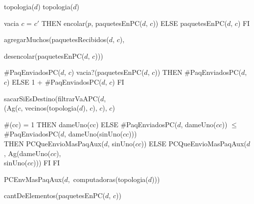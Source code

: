 \begin{tad}{}
	 {topologia($d$)}
	 {topologia($d$)}

	 {vacia}
	 { \IF $c$ = $c'$
																	THEN encolar($p$, paquetesEnPC($d$, $c$))
																	ELSE paquetesEnPC($d$, $c$)
																	FI}	
			  {agregarMuchos(paquetesRecibidos($d$, $c$), 			  
			  
			  \hspace{6.5em}  desencolar(paquetesEnPC($d$, $c$)))}
	
	 {\#PaqEnviadosPC($d$, $c$)}
	 { \IF vacia?(paquetesEnPC($d$, $c$))
															 THEN \#PaqEnviadosPC($d$, $c$)
															 ELSE 1 + \#PaqEnviadosPC($d$, $c$)
															 FI}	
	
	 {sacarSiEsDestino(filtrarVaAPC($d$, \\
												(Ag($c$, vecinos(topologia($d$), $c$), $c$), $c$)}
	
	
	
	
	 { \IF \#(cc) = 1
												THEN dameUno(cc)
												ELSE {\IF \#PaqEnviadosPC($d$, dameUno($cc$)) $\leq$ \\
										        		 \hspace*{1.1em}\#PaqEnviadosPC($d$, dameUno(sinUno($cc$)))\\
											 		 THEN PCQueEnvioMasPaqAux($d$, sinUno($cc$))
											 		 ELSE PCQueEnvioMasPaqAux($d$, Ag(dameUno($cc$), \\
											 		 \hspace*{14em}				      sinUno($cc$)))
													 FI}
												FI}	
	
	 {\mbox{PCEnvMasPaqAux($d$, computadoras(topologia($d$)))}}
	
	 {cantDeElementos(paquetesEnPC($d$, $c$))}
					
\end{tad}
